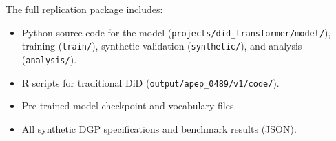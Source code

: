 \documentclass[12pt]{article}
\begin{document}
The full replication package includes:
\begin{itemize}
\item Python source code for the model (\texttt{projects/did\_transformer/model/}), training (\texttt{train/}), synthetic validation (\texttt{synthetic/}), and analysis (\texttt{analysis/}).
\item R scripts for traditional DiD (\texttt{output/apep\_0489/v1/code/}).
\item Pre-trained model checkpoint and vocabulary files.
\item All synthetic DGP specifications and benchmark results (JSON).
\end{itemize}
\end{document}
